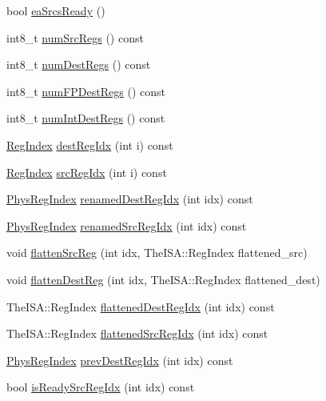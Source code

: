 \begin{DoxyCompactItemize}
\item 
bool \hyperlink{classInOrderDynInst_ae3a07556a5b5d8248cbfb1c99561340d}{eaSrcsReady} ()
\item 
int8\_\-t \hyperlink{classInOrderDynInst_a3902ecc708a6f28e94ee9aa975692915}{numSrcRegs} () const 
\item 
int8\_\-t \hyperlink{classInOrderDynInst_ab7e23352b3d45a982dfeb799030f87d0}{numDestRegs} () const 
\item 
int8\_\-t \hyperlink{classInOrderDynInst_a7ec0ad00d322ae83bc5fae443ef04323}{numFPDestRegs} () const 
\item 
int8\_\-t \hyperlink{classInOrderDynInst_a3935410f8201e0afd0f8e459f838b463}{numIntDestRegs} () const 
\item 
\hyperlink{classInOrderDynInst_a36d25e03e43fa3bb4c5482cbefe5e0fb}{RegIndex} \hyperlink{classInOrderDynInst_ae5a1a6d72f40f715253b91e32b3caad2}{destRegIdx} (int i) const 
\item 
\hyperlink{classInOrderDynInst_a36d25e03e43fa3bb4c5482cbefe5e0fb}{RegIndex} \hyperlink{classInOrderDynInst_a9353aea3dfe673b88a4a96163d58759f}{srcRegIdx} (int i) const 
\item 
\hyperlink{classInOrderDynInst_a5ec29599c4bc29a3054c451674969e7b}{PhysRegIndex} \hyperlink{classInOrderDynInst_ab7e10290401d7350e965a28388ad29d8}{renamedDestRegIdx} (int idx) const 
\item 
\hyperlink{classInOrderDynInst_a5ec29599c4bc29a3054c451674969e7b}{PhysRegIndex} \hyperlink{classInOrderDynInst_a77110024c396fae8eb7cc90446c05100}{renamedSrcRegIdx} (int idx) const 
\item 
void \hyperlink{classInOrderDynInst_a6d7b8014473aa1288b169417e8b2f2fe}{flattenSrcReg} (int idx, TheISA::RegIndex flattened\_\-src)
\item 
void \hyperlink{classInOrderDynInst_aa63107f986e5c741f58413c6643298fb}{flattenDestReg} (int idx, TheISA::RegIndex flattened\_\-dest)
\item 
TheISA::RegIndex \hyperlink{classInOrderDynInst_ae669db55c176447543f27f35c1cd3ae5}{flattenedDestRegIdx} (int idx) const 
\item 
TheISA::RegIndex \hyperlink{classInOrderDynInst_a9ac37f020700c290097f15cacfd59b33}{flattenedSrcRegIdx} (int idx) const 
\item 
\hyperlink{classInOrderDynInst_a5ec29599c4bc29a3054c451674969e7b}{PhysRegIndex} \hyperlink{classInOrderDynInst_a0e34129e87398c9ff1f764e577b7b79f}{prevDestRegIdx} (int idx) const 
\item 
bool \hyperlink{classInOrderDynInst_ad09a59cb16b4b96a42398b3bcd23cd2b}{isReadySrcRegIdx} (int idx) const 

\end{DoxyCompactItemize}
